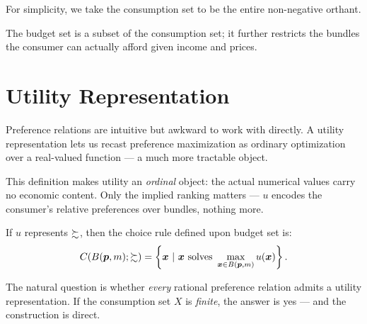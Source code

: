 For simplicity, we take the consumption set to be the entire non-negative orthant.


The budget set is a subset of the consumption set; it further restricts the bundles the consumer can actually afford given income and prices.



\section{Utility Representation}\label{utility-representation}

Preference relations are intuitive but awkward to work with directly.
A utility representation lets us recast preference maximization as
ordinary optimization over a real-valued function — a much more
tractable object.


This definition makes utility an \emph{ordinal} object: the actual
numerical values carry no economic content. Only the implied ranking
matters — \(u\) encodes the consumer's relative preferences over
bundles, nothing more.

If \(u\) represents \(\succsim\), then the choice rule defined upon budget
set is:
\[C(B(\bm p,m);\succsim) = \left\{\bm x\ | \ \bm x \text{ solves }\max_{\bm x\in B(\bm p,m) } u(\bm x) \right\}.\]



The natural question is whether \emph{every} rational preference relation
admits a utility representation. If the consumption set \(X\) is
\textit{finite}, the answer is yes — and the construction is direct.

